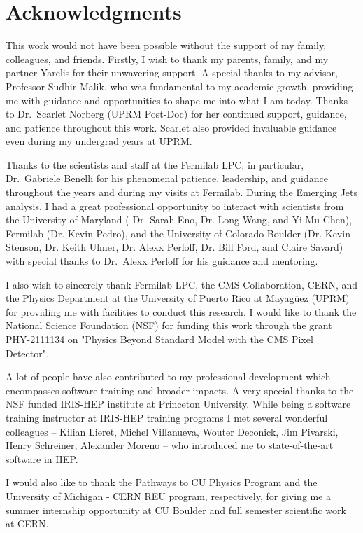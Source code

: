 \chapter*{Acknowledgments}

This work would not have been possible without the support of my family, colleagues, and friends. Firstly, I wish to thank my parents, family, and my partner Yarelis for their unwavering support. A special thanks to my advisor, Professor Sudhir Malik, who was fundamental to my academic growth, providing me with guidance and opportunities to shape me into what I am today. Thanks to Dr.~Scarlet Norberg (UPRM Post-Doc) for her continued support, guidance, and patience throughout this work. Scarlet also provided invaluable guidance even during my undergrad years at UPRM.

Thanks to the scientists and staff at the Fermilab LPC, in particular, Dr.~Gabriele Benelli for his phenomenal patience, leadership, and guidance throughout the years and during my visits at Fermilab. During the Emerging Jets analysis, I had a great professional opportunity to interact with scientists from the University of Maryland ( Dr. Sarah Eno, Dr. Long Wang, and Yi-Mu Chen), Fermilab (Dr. Kevin Pedro), and the University of Colorado Boulder (Dr. Kevin Stenson, Dr. Keith Ulmer, Dr. Alexx Perloff, Dr. Bill Ford, and Claire Savard) with special thanks to Dr.~Alexx Perloff for his guidance and mentoring.


I also wish to sincerely thank Fermilab LPC, the CMS Collaboration, CERN, and the Physics Department at the University of Puerto Rico at Mayagüez (UPRM) for providing me with facilities to conduct this research.
I would like to thank the National Science Foundation (NSF) for funding this work through the grant PHY-2111134 on "Physics Beyond Standard Model with the CMS Pixel Detector".

A lot of people have also contributed to my professional development which encompasses software training and broader impacts. A very special thanks to the NSF funded IRIS-HEP institute at Princeton University. While being a software training instructor at IRIS-HEP training programs I met several wonderful colleagues --  Kilian Lieret, Michel Villanueva, Wouter Deconick, Jim Pivarski, Henry Schreiner, Alexander Moreno -- who introduced me to state-of-the-art software in HEP.

I would also like to thank the Pathways to CU Physics Program and the University of Michigan - CERN REU program, respectively, for giving me a summer internship opportunity at CU Boulder and full semester scientific work at CERN.

